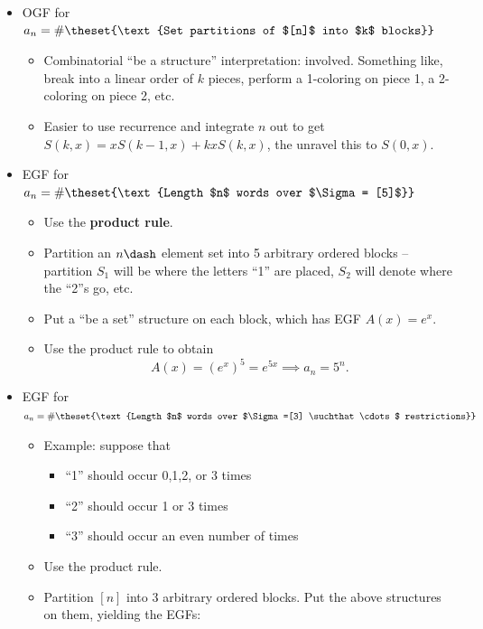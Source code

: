 \begin{itemize}
\tightlist
\item
  OGF for
  \(a_n = \#\theset{\text{Set partitions of $[n]$ into $k$ blocks}}\)

  \begin{itemize}
  \tightlist
  \item
    Combinatorial ``be a structure'' interpretation: involved. Something
    like, break into a linear order of \(k\) pieces, perform a
    1-coloring on piece 1, a 2-coloring on piece 2, etc.
  \item
    Easier to use recurrence and integrate \(n\) out to get
    \(S(k, x) = xS(k-1, x) + kxS(k, x)\), the unravel this to
    \(S(0, x)\).
  \end{itemize}
\item
  EGF for
  \(a_n = \#\theset{\text{Length $n$ words over $\Sigma = [5]$}}\)

  \begin{itemize}
  \tightlist
  \item
    Use the \textbf{product rule}.
  \item
    Partition an \(n\dash\) element set into 5 arbitrary ordered blocks
    -- partition \(S_1\) will be where the letters ``1'' are placed,
    \(S_2\) will denote where the ``2''s go, etc.
  \item
    Put a ``be a set'' structure on each block, which has EGF
    \(A(x) = e^x\).
  \item
    Use the product rule to obtain \[
    A(x) = (e^x)^5 = e^{5x} \implies a_n = 5^n.
    \]
  \end{itemize}
\item
  EGF for
  \(a_n = \#\theset{\text{Length $n$ words over $\Sigma =[3] \suchthat \cdots$ restrictions}}\)

  \begin{itemize}
  \tightlist
  \item
    Example: suppose that

    \begin{itemize}
    \tightlist
    \item
      ``1'' should occur 0,1,2, or 3 times
    \item
      ``2'' should occur 1 or 3 times
    \item
      ``3'' should occur an even number of times
    \end{itemize}
  \item
    Use the product rule.
  \item
    Partition \([n]\) into 3 arbitrary ordered blocks. Put the above
    structures on them, yielding the EGFs:


\end{itemize}
\end{itemize}
